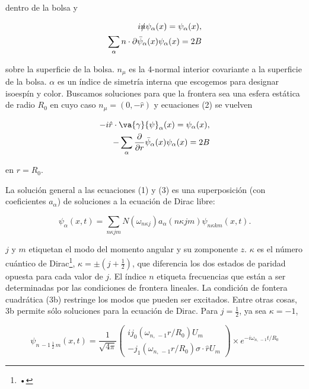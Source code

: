 dentro de la bolsa y

\begin{eqnarray}
i \slashed{n} {\psi}_{\alpha} (x) = {\psi}_{\alpha} (x), \\
\sum_{\alpha} n \cdot {\partial} \bar{\psi}_{\alpha} (x) {\psi}_{\alpha} (x) = 2B
\end{eqnarray}

sobre la superficie de la bolsa. ${n}_{\mu}$ es la 4-normal interior covariante a la superficie de la bolsa. $\alpha$ es un índice de simetría interna que escogemos para designar isoespín y color. Buscamos soluciones para que la frontera sea una esfera estática de radio ${R}_{0}$ en cuyo caso ${n}_{\mu} = (0, - \hat{r})$ y ecuaciones (2) se vuelven

\begin{eqnarray}
-i \hat{r} \cdot \va{\gamma}{\psi}_{\alpha} (x) = {\psi}_{\alpha}(x), \\
-\sum_{\alpha} \frac{\partial}{\partial r} \bar{\psi}_{\alpha}(x) {\psi}_{\alpha} (x) = 2B
\end{eqnarray}

en $r= {R}_{0}$.

La solución general a las ecuaciones (1) y (3) es una superposición (con coeficientes ${a}_{\alpha}$) de soluciones a la ecuación de Dirac libre:

\begin{equation}
{\psi}_{\alpha}(x,t) = \sum_{n \kappa j m} N ({\omega}_{n \kappa j}) {a}_{\alpha} (n \kappa j m) {\psi}_{n \kappa k m} (x, t).
\end{equation}

$j$ y $m$ etiquetan el modo del momento angular y su zomponente $z$. $\kappa$ es el número cuántico de Dirac\footnote{•}, $\kappa = \pm (j + \frac{1}{2})$, que diferencia los dos estados de paridad opuesta para cada valor de $j$.  El índice $n$ etiqueta frecuencias que están a ser determinadas por las condiciones de frontera lineales. La  condición de fontera cuadrática (3b) restringe los modos que pueden ser excitados. Entre otras cosas, 3b permite sólo soluciones para la ecuación de Dirac.
Para $j = \frac{1}{2}$, ya sea $\kappa = - 1$,

\begin{equation}
{\psi}_{n \, -1 \, \frac{1}{2} \, m} (x,t) = \frac{1}{\sqrt{4 \pi}} 
\left( 
\begin{array}{c}
i {j}_{0} ({\omega}_{n, \, -1} r / {R}_{0}) {U}_{m} \\
- {j}_{1} ({\omega}_{n, \, -1} r / {R}_{0}) \sigma \cdot \hat{r}{U}_{m} 
\end{array}
\right) \times {e}^{- i {\omega}_{n, \, -1} t / {R}_{0}}
\end{equation}

